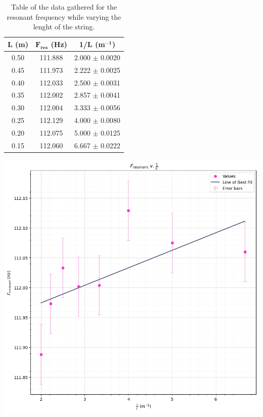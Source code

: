\documentclass[12pt]{article}
\begin{document}
\begin{minipage}{0.45\textwidth}
    \captionsetup{hypcap=false}
\begin{table}[H]
    \centering
    \begin{tabular}{|c|c|c|}
    \hline
    \textbf{L (m)} & \textbf{$\mathbf{F_{res}}$ (Hz)} & \textbf{1/L (m$\mathbf{^{-1}}$)} \\ \hline
    0.50 & 111.888 & 2.000 $\pm$ 0.0020 \\ \hline
    0.45 & 111.973 & 2.222 $\pm$ 0.0025 \\ \hline
    0.40 & 112.033 & 2.500 $\pm$ 0.0031 \\ \hline
    0.35 & 112.002 & 2.857 $\pm$ 0.0041 \\ \hline
    0.30 & 112.004 & 3.333 $\pm$ 0.0056 \\ \hline
    0.25 & 112.129 & 4.000 $\pm$ 0.0080 \\ \hline
    0.20 & 112.075 & 5.000 $\pm$ 0.0125 \\ \hline
    0.15 & 112.060 & 6.667 $\pm$ 0.0222 \\ \hline
    \end{tabular}
    \caption{\centering Table of the data gathered for the resonant frequency while varying the lenght of the string.}
    \label{tab:1}
\end{table}
\end{minipage}
\hfill
\begin{minipage}{.5\textwidth}
    \captionsetup{hypcap=false}
    \includegraphics[width=\linewidth]{waves length graph.png}
    \label{fig:lengthgraph}
\end{minipage}
\end{document}

